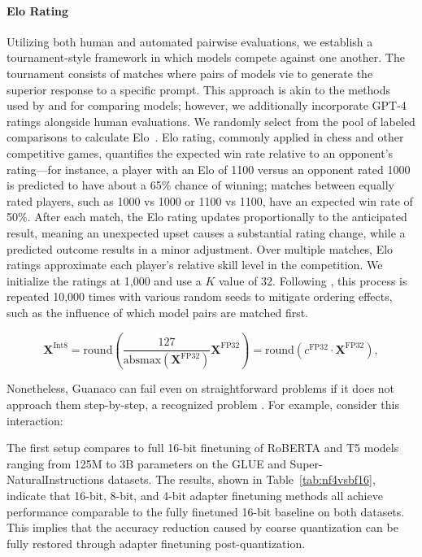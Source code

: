 \paragraph{Elo Rating} Utilizing both human and automated pairwise evaluations, we establish a tournament-style framework in which models compete against one another. The tournament consists of matches where pairs of models vie to generate the superior response to a specific prompt. This approach is akin to the methods used by \citet{bai2022training} and \citet{vicuna2023} for comparing models; however, we additionally incorporate GPT-4 ratings alongside human evaluations. We randomly select from the pool of labeled comparisons to calculate Elo~\citep{elo1967proposed,elo1978rating}. Elo rating, commonly applied in chess and other competitive games, quantifies the expected win rate relative to an opponent’s rating—for instance, a player with an Elo of 1100 versus an opponent rated 1000 is predicted to have about a 65\% chance of winning; matches between equally rated players, such as 1000 vs 1000 or 1100 vs 1100, have an expected win rate of 50\%. After each match, the Elo rating updates proportionally to the anticipated result, meaning an unexpected upset causes a substantial rating change, while a predicted outcome results in a minor adjustment. Over multiple matches, Elo ratings approximate each player’s relative skill level in the competition. We initialize the ratings at 1,000 and use a $K$ value of 32. Following \citet{vicuna2023}, this process is repeated 10,000 times with various random seeds to mitigate ordering effects, such as the influence of which model pairs are matched first.

\begin{equation}
    \mathbf{X}^{ \text{Int8}} = \text{round}\left( \frac{127}{{\text{absmax}}(\mathbf{X}^{{\text{FP32}}})}\mathbf{X}^{{\text{FP32}}} \right) = \text{round}(c^{\text{FP32}}\cdot \mathbf{X}^{{\text{FP32}}}),
\end{equation}

Nonetheless, {Guanaco} can fail even on straightforward problems if it does not approach them step-by-step, a recognized problem \cite{weichain}. For example, consider this interaction:

The first setup compares to full 16-bit finetuning of RoBERTA and T5 models ranging from 125M to 3B parameters on the GLUE and Super-NaturalInstructions datasets. The results, shown in Table~\ref{tab:nf4vsbf16}, indicate that 16-bit, 8-bit, and 4-bit adapter finetuning methods all achieve performance comparable to the fully finetuned 16-bit baseline on both datasets. This implies that the accuracy reduction caused by coarse quantization can be fully restored through adapter finetuning post-quantization.

